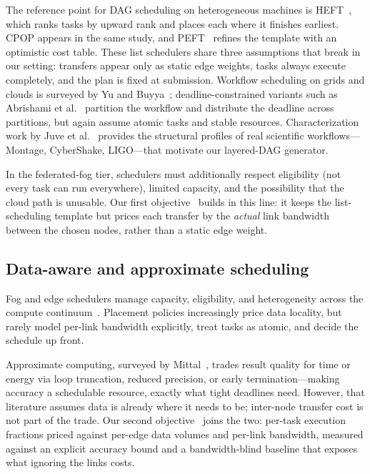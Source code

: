\documentclass[11pt]{article}
\begin{document}
The reference point for DAG scheduling on heterogeneous machines
is HEFT~\cite{topcuoglu2002heft}, which ranks tasks by upward
rank and places each where it finishes earliest. CPOP appears in
the same study, and PEFT~\cite{arabnejad2014peft} refines the
template with an optimistic cost table. These list schedulers
share three assumptions that break in our setting: transfers
appear only as static edge weights, tasks always execute
completely, and the plan is fixed at submission. Workflow
scheduling on grids and clouds is surveyed by Yu and
Buyya~\cite{yu2005taxonomy}; deadline-constrained variants such
as Abrishami et al.~\cite{abrishami2013deadline} partition the
workflow and distribute the deadline across partitions, but
again assume atomic tasks and stable resources. Characterization
work by Juve et al.~\cite{juve2013workflows} provides the
structural profiles of real scientific workflows---Montage,
CyberShake, LIGO---that motivate our layered-DAG generator.

In the federated-fog tier, schedulers must additionally respect
eligibility (not every task can run everywhere), limited
capacity, and the possibility that the cloud path is unusable.
Our first objective~\cite{gupta2025efficient} builds in this
line: it keeps the list-scheduling template but prices each
transfer by the \emph{actual} link bandwidth between the chosen
nodes, rather than a static edge weight.

\subsection{Data-aware and approximate scheduling}

Fog and edge schedulers manage capacity, eligibility, and
heterogeneity across the compute
continuum~\cite{mouradian2018fog,yi2015fog}. Placement policies
increasingly price data locality, but rarely model per-link
bandwidth explicitly, treat tasks as atomic, and decide the
schedule up front.

Approximate computing, surveyed by
Mittal~\cite{mittal2016approx}, trades result quality for time
or energy via loop truncation, reduced precision, or early
termination---making accuracy a schedulable resource, exactly
what tight deadlines need. However, that literature assumes data
is already where it needs to be; inter-node transfer cost is not
part of the trade. Our second objective~\cite{gupta2026dataaware}
joins the two: per-task execution fractions priced against
per-edge data volumes and per-link bandwidth, measured against
an explicit accuracy bound and a bandwidth-blind baseline that
exposes what ignoring the links costs.
\end{document}
